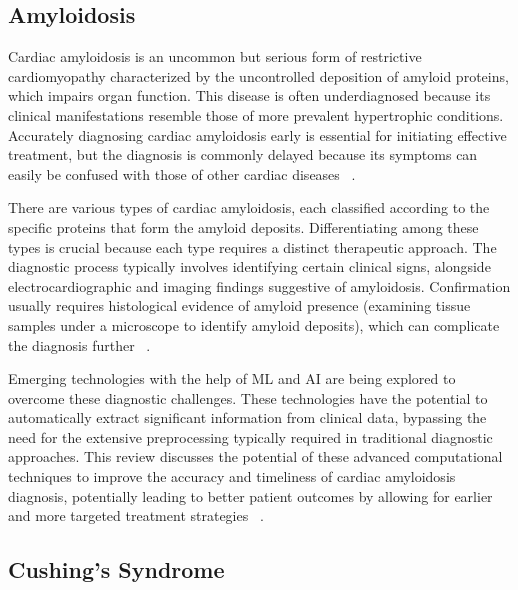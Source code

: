 \subsection{Amyloidosis}


Cardiac amyloidosis is an uncommon but serious form of restrictive cardiomyopathy characterized by the uncontrolled deposition of amyloid proteins, which impairs organ function. This disease is often underdiagnosed because its clinical manifestations resemble those of more prevalent hypertrophic conditions. Accurately diagnosing cardiac amyloidosis early is essential for initiating effective treatment, but the diagnosis is commonly delayed because its symptoms can easily be confused with those of other cardiac diseases ~\cite{ijms24065680}.

There are various types of cardiac amyloidosis, each classified according to the specific proteins that form the amyloid deposits. Differentiating among these types is crucial because each type requires a distinct therapeutic approach. The diagnostic process typically involves identifying certain clinical signs, alongside electrocardiographic and imaging findings suggestive of amyloidosis. Confirmation usually requires histological evidence of amyloid presence (examining tissue samples under a microscope to identify amyloid deposits), which can complicate the diagnosis further ~\cite{ijms24065680}.

Emerging technologies with the help of ML and AI are being explored to overcome these diagnostic challenges. These technologies have the potential to automatically extract significant information from clinical data, bypassing the need for the extensive preprocessing typically required in traditional diagnostic approaches. This review discusses the potential of these advanced computational techniques to improve the accuracy and timeliness of cardiac amyloidosis diagnosis, potentially leading to better patient outcomes by allowing for earlier and more targeted treatment strategies ~\cite{ijms24065680}.

\subsection{Cushing's Syndrome}

